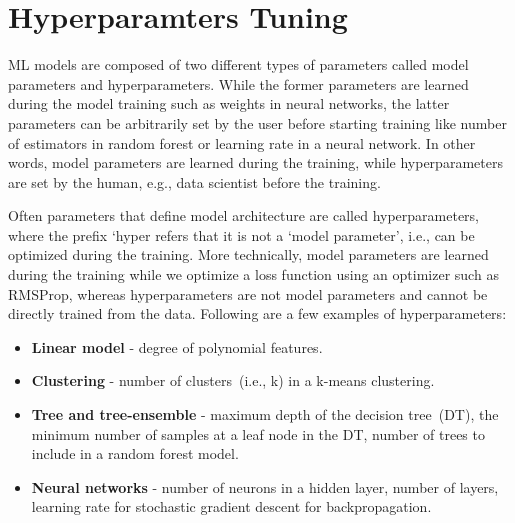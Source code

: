 \section{Hyperparamters Tuning}
ML models are composed of two different types of parameters called model parameters and hyperparameters. While the former parameters are learned during the model training such as weights in neural networks, the latter parameters can be arbitrarily set by the user before starting training like number of estimators in random forest or learning rate in a neural network. In other words, model parameters are learned during the training, while hyperparameters are set by the human, e.g., data scientist before the training.

\hspace*{3.5mm} Often parameters that define model architecture are called hyperparameters, where the prefix `hyper refers that it is not a `model parameter', i.e., can be optimized during the training. More technically, model parameters are learned during the training while we optimize a loss function using an optimizer such as RMSProp, whereas hyperparameters are not model parameters and cannot be directly trained from the data. Following are a few examples of hyperparameters: 

\vspace{-1mm}
\begin{itemize}[noitemsep]
    \item \textbf{Linear model} - degree of polynomial features.
    \item \textbf{Clustering} - number of clusters~(i.e., k) in a k-means clustering.
    \item \textbf{Tree and tree-ensemble} - maximum depth of the decision tree~(DT), the minimum number of samples at a leaf node in the DT, number of trees to include in a random forest model. 
    \item \textbf{Neural networks} - number of neurons in a hidden layer, number of layers, learning rate for stochastic gradient descent for backpropagation. 
\end{itemize} 
\vspace{-2mm}

